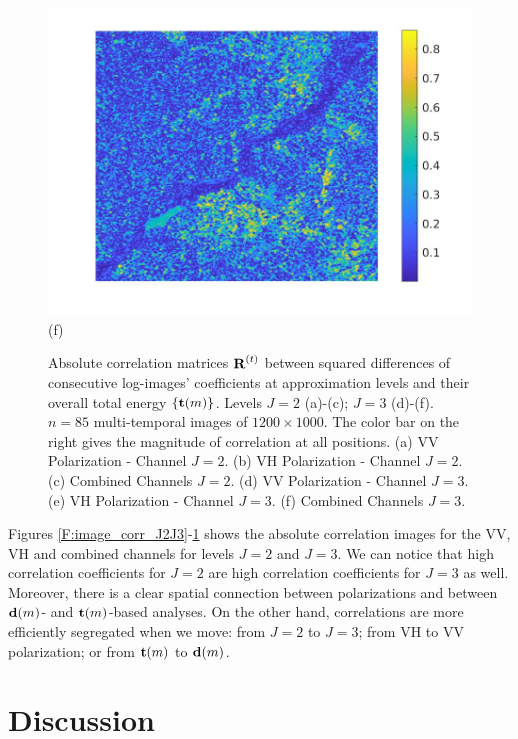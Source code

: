 \documentclass[journal]{IEEEtran}
\newcommand{\vd}{{\textbf d}}
\newcommand{\vR}{{\textbf R}}
\newcommand{\vt}{{\textbf t}}
\begin{document}
\begin{figure}[htp!]
\includegraphics[scale=.12]{../../figs/consecdif_J3_euclid_image_cor}(f)

\caption{Absolute correlation matrices $\vR^{(t)}$ between squared differences of consecutive log-images' coefficients at approximation levels and their overall total energy $\{\vt(m)\}$. Levels $J=2$ (a)-(c);  $J=3$ (d)-(f). $n=85$ multi-temporal images of $1200\times 1000$. The color bar on the right gives the magnitude of correlation at all positions. (a) {\sc VV  Polarization - Channel} $J=2$. (b) {\sc VH  Polarization - Channel} $J=2$. (c) {\sc Combined Channels} $J=2$. (d)  {\sc VV  Polarization - Channel} $J=3$. (e) {\sc VH  Polarization - Channel} $J=3$. (f) {\sc Combined Channels} $J=3$.} 
\label{F:image_corr_J2J3_consec}
\end{figure}

Figures \ref{F:image_corr_J2J3}-\ref{F:image_corr_J2J3_consec} shows the absolute correlation images for the VV, VH and combined channels for levels $J=2$ and $J=3$. We can notice that high correlation coefficients for $J=2$ are high correlation coefficients for $J=3$ as well. Moreover, there is a clear spatial connection between polarizations and between $\vd(m)$- and $\vt(m)$-based  analyses. On the other hand, correlations are more efficiently segregated when we move: from $J=2$ to $J=3$; from VH to VV polarization; or from  $\vt(m)$ to $\vd(m)$.




\section{Discussion}\label{section_discussion}
\end{document}
